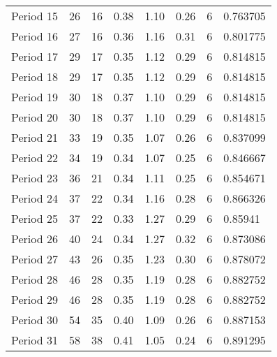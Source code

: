 \begin{tabular}{lrrrrrrl}
Period 15 &                      26 &          16 &        0.38 &        1.10 &        0.26 &           6 &   0.763705 \\
Period 16 &                      27 &          16 &        0.36 &        1.16 &        0.31 &           6 &   0.801775 \\
Period 17 &                      29 &          17 &        0.35 &        1.12 &        0.29 &           6 &   0.814815 \\
Period 18 &                      29 &          17 &        0.35 &        1.12 &        0.29 &           6 &   0.814815 \\
Period 19 &                      30 &          18 &        0.37 &        1.10 &        0.29 &           6 &   0.814815 \\
Period 20 &                      30 &          18 &        0.37 &        1.10 &        0.29 &           6 &   0.814815 \\
Period 21 &                      33 &          19 &        0.35 &        1.07 &        0.26 &           6 &   0.837099 \\
Period 22 &                      34 &          19 &        0.34 &        1.07 &        0.25 &           6 &   0.846667 \\
Period 23 &                      36 &          21 &        0.34 &        1.11 &        0.25 &           6 &   0.854671 \\
Period 24 &                      37 &          22 &        0.34 &        1.16 &        0.28 &           6 &   0.866326 \\
Period 25 &                      37 &          22 &        0.33 &        1.27 &        0.29 &           6 &    0.85941 \\
Period 26 &                      40 &          24 &        0.34 &        1.27 &        0.32 &           6 &   0.873086 \\
Period 27 &                      43 &          26 &        0.35 &        1.23 &        0.30 &           6 &   0.878072 \\
Period 28 &                      46 &          28 &        0.35 &        1.19 &        0.28 &           6 &   0.882752 \\
Period 29 &                      46 &          28 &        0.35 &        1.19 &        0.28 &           6 &   0.882752 \\
Period 30 &                      54 &          35 &        0.40 &        1.09 &        0.26 &           6 &   0.887153 \\
Period 31 &                      58 &          38 &        0.41 &        1.05 &        0.24 &           6 &   0.891295 \\

\end{tabular}
